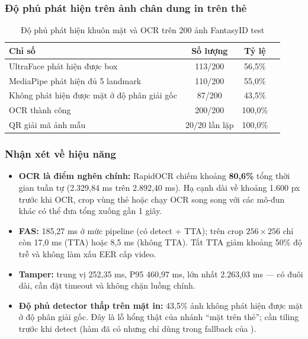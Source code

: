 \documentclass[12pt,a4paper]{article}
\begin{document}
\subsubsection{Độ phủ phát hiện trên ảnh chân dung in trên thẻ}
\begin{table}[H]
  \centering
  \caption{Độ phủ phát hiện khuôn mặt và OCR trên 200 ảnh FantasyID test}
  \label{tab:coverage-detect}
  \small
  \begin{tabular}{@{}lccc@{}}
    \toprule
    \textbf{Chỉ số} & \textbf{Số lượng} & \textbf{Tỷ lệ}\\
    \midrule
    UltraFace phát hiện được box & 113/200 & 56,5\%\\
    MediaPipe phát hiện đủ 5 landmark & 110/200 & 55,0\%\\
    Không phát hiện được mặt ở độ phân giải gốc & 87/200 & 43,5\%\\
    OCR thành công & 200/200 & 100,0\%\\
    QR giải mã ảnh mẫu & 20/20 lần lặp & 100,0\%\\
    \bottomrule
  \end{tabular}
\end{table}

\subsubsection{Nhận xét về hiệu năng}
\begin{itemize}
  \item \textbf{OCR là điểm nghẽn chính:} RapidOCR \cite{rapidocr,du2020ppocr} chiếm khoảng \textbf{80,6\%} tổng thời gian tuần tự
        (2.329,84 ms trên 2.892,40 ms). Hạ cạnh dài về khoảng 1.600 px trước khi OCR, crop vùng thẻ hoặc
        chạy OCR song song với các mô-đun khác có thể đưa tổng xuống gần 1 giây.
  \item \textbf{FAS:} 185,27 ms ở mức pipeline (có detect + TTA); trên crop $256\times256$ chỉ còn
        17,0 ms (TTA) hoặc 8,5 ms (không TTA). Tắt TTA giảm khoảng 50\% độ trễ và không làm xấu EER cấp video.
  \item \textbf{Tamper:} trung vị 252,35 ms, P95 460,97 ms, lớn nhất 2.263,03 ms --- có đuôi dài, cần
        đặt timeout và không chặn luồng chính.
  \item \textbf{Độ phủ detector thấp trên mặt in:} 43,5\% ảnh không phát hiện được mặt ở độ phân giải gốc.
        Đây là lỗ hổng thật của nhánh ``mặt trên thẻ''; cần tiling trước khi detect (hàm
         đã có nhưng chỉ dùng trong fallback của ).
\end{itemize}
\end{document}
